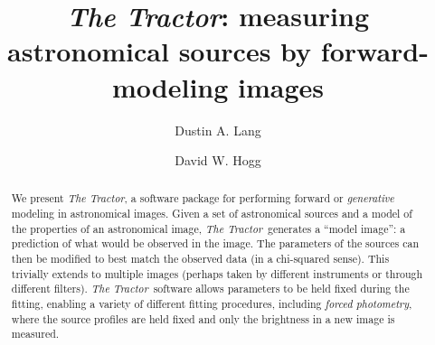 \documentclass[modern, linenumbers]{aastex631}
\newcommand{\thetractor}{\emph{The Tractor}}
\begin{document}
\title{\emph{The Tractor}: measuring astronomical sources by forward-modeling images}

\author[0000-0002-1172-0754]{Dustin A. Lang}

\author[0000-0003-2866-9403]{David W. Hogg}

\begin{abstract}
  We present \thetractor, a software package for performing forward or
  \emph{generative} modeling in astronomical images.  Given a set of
  astronomical sources and a model of the properties of an
  astronomical image, \thetractor\ generates a ``model image'': a
  prediction of what would be observed in the image. 
  The parameters of the sources can then be modified to best match
  the observed data (in a chi-squared sense).
  This trivially extends to multiple images (perhaps taken by different instruments or through different filters).
  \thetractor\ software allows parameters to be held fixed during the
  fitting, enabling a variety of different fitting procedures,
  including \emph{forced photometry}, where the source profiles are
  held fixed and only the brightness in a new image is measured.
\end{abstract}

\end{document}
